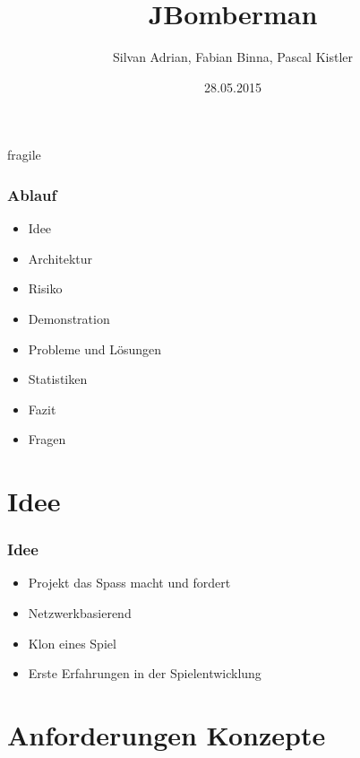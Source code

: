 \documentclass[10pt, compress]{beamer}
\title{JBomberman}
\subtitle{}
\date{28.05.2015}
\author{Silvan Adrian, Fabian Binna, Pascal Kistler}
\institute{Hochschule für Technik Rapperswil}
\begin{document}
\maketitle

\begin{frame}{fragile}
	\frametitle{Ablauf}
	\begin{itemize}
	\item Idee
	\item Architektur
	\item Risiko
	\item Demonstration
	\item Probleme und Lösungen
	\item Statistiken
	\item Fazit
	\item Fragen
	\end{itemize}
\end{frame}


\section{Idee}
\begin{frame}[fragile]
  \frametitle{Idee}
	\begin{itemize}
	  \item Projekt das Spass macht und fordert
	  \item Netzwerkbasierend
	  \item Klon eines Spiel
	  \item Erste Erfahrungen in der Spielentwicklung
	\end{itemize}
\end{frame}



\section{Anforderungen  Konzepte}
\end{document}

